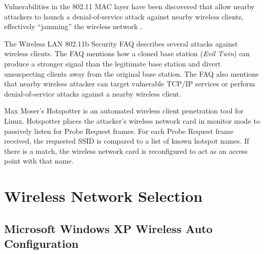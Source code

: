 \documentclass[10pt,twocolumn]{article}
\begin{document}
Vulnerabilities in the 802.11 MAC layer have been discovered that
allow nearby attackers to launch a denial-of-service attack against
nearby wireless clients, effectively ``jamming'' the wireless
network \cite{nobles05wlandos}.

The Wireless LAN 802.11b Security FAQ \cite{klaus02wlan} describes
several attacks against wireless clients.  The FAQ mentions how a
cloned base station ({\it Evil Twin}) can produce a stronger signal
than the legitimate base station and divert unsuspecting clients away
from the original base station.  The FAQ also mentions that nearby
wireless attacker can target vulnerable TCP/IP services or perform
denial-of-service attacks against a nearby wireless client.

Max Moser's Hotspotter \cite{moser04hotspotter} is an
automated wireless client penetration tool for Linux.  Hotspotter
places the attacker's wireless network card in monitor mode to
passively listen for Probe Request frames.  For each Probe Request
frame received, the requested SSID is compared to a list of known
hotspot names.  If there is a match, the wireless network card is
reconfigured to act as an access point with that name.

\section{Wireless Network Selection}
\label{wlanselection}
\subsection{Microsoft Windows XP Wireless Auto Configuration}
\end{document}
